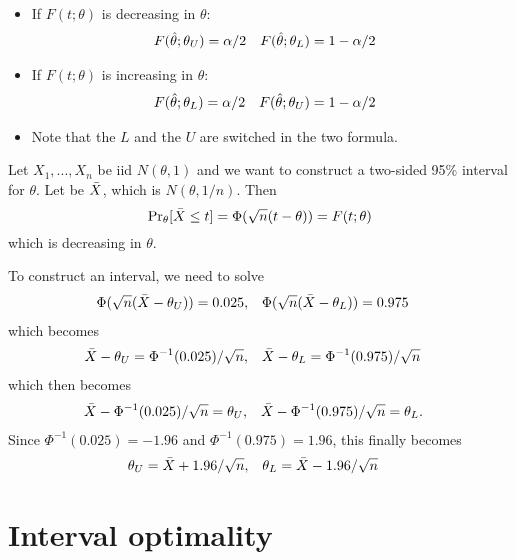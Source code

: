 \begin{itemize}[leftmargin=0pt]
  \begin{itemize}
  \item If $F(t; \theta)$ is decreasing in $\theta$:
    \begin{align*}
      F(\hat{\theta}; \theta_U) &= \alpha/2 & F(\hat{\theta}; \theta_L) &= 1 - \alpha/2
    \end{align*}
  \item If $F(t; \theta)$ is increasing in $\theta$:
    \begin{align*}
      F(\hat{\theta}; \theta_L) &= \alpha/2 & F(\hat{\theta}; \theta_U) &= 1 - \alpha/2
    \end{align*}
  \item Note that the $L$ and the $U$ are switched in the two formula.
  \end{itemize}

  \begin{ex} Let $X_1,...,X_n$ be iid $N(\theta, 1)$ and we want to
    construct a two-sided 95\% interval for $\theta$.  Let be $\bar{X}$, which
    is $N(\theta, 1/n)$.  Then
    \begin{equation*}
      \operatorname{Pr}_\theta[\bar{X} \leq t] = \Phi(\sqrt{n} (t - \theta)) = F(t; \theta)
    \end{equation*}
    which is decreasing in $\theta$.

    To construct an interval, we need to solve
    \begin{align*}
      \Phi(\sqrt{n} (\bar{X} - \theta_U)) &= 0.025, &
      \Phi(\sqrt{n} (\bar{X} - \theta_L)) &= 0.975
    \end{align*}
    which becomes
    \begin{align*}
      \bar{X} - \theta_U &= \Phi^{-1}(0.025) / \sqrt{n}, &
      \bar{X} - \theta_L &= \Phi^{-1}(0.975) / \sqrt{n}
    \end{align*}
    which then becomes
    \begin{align*}
      \bar{X} - \Phi^{-1}(0.025) / \sqrt{n} &= \theta_U, &
      \bar{X} - \Phi^{-1}(0.975) / \sqrt{n} &= \theta_L.
    \end{align*}
    Since $\Phi^{-1}(0.025) = -1.96$ and $\Phi^{-1}(0.975) = 1.96$, this
    finally becomes
    \begin{align*}
      \theta_U &= \bar{X} + 1.96 / \sqrt{n}, &
      \theta_L &= \bar{X} - 1.96 / \sqrt{n}
    \end{align*}
  \end{ex}

\end{itemize}

\section{Interval optimality}

